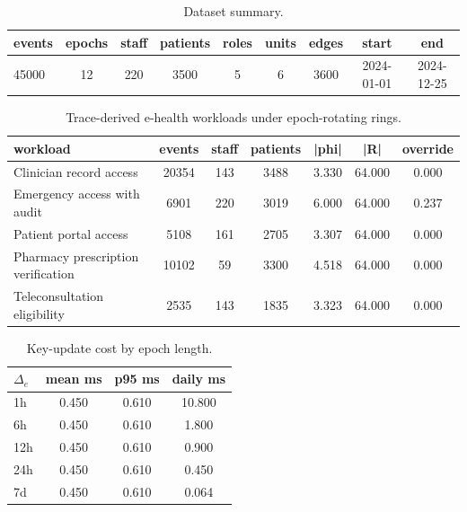 \begin{table}[t]
\centering
\caption{Dataset summary.}
\label{tab:dataset-summary}
\begin{tabular}{@{}lcccccccc@{}}
\toprule
events & epochs & staff & patients & roles & units & edges & start & end \\
\midrule
45000 & 12 & 220 & 3500 & 5 & 6 & 3600 & 2024-01-01 & 2024-12-25 \\
\bottomrule
\end{tabular}
\end{table}

\begin{table}[t]
\centering
\caption{Trace-derived e-health workloads under epoch-rotating rings.}
\label{tab:ehealth-workloads}
\begin{tabular}{@{}lcccccc@{}}
\toprule
workload & events & staff & patients & |phi| & |R| & override \\
\midrule
Clinician record access & 20354 & 143 & 3488 & 3.330 & 64.000 & 0.000 \\
Emergency access with audit & 6901 & 220 & 3019 & 6.000 & 64.000 & 0.237 \\
Patient portal access & 5108 & 161 & 2705 & 3.307 & 64.000 & 0.000 \\
Pharmacy prescription verification & 10102 & 59 & 3300 & 4.518 & 64.000 & 0.000 \\
Teleconsultation eligibility & 2535 & 143 & 1835 & 3.323 & 64.000 & 0.000 \\
\bottomrule
\end{tabular}
\end{table}

\begin{table}[t]
\centering
\caption{Key-update cost by epoch length.}
\label{tab:key-update}
\begin{tabular}{@{}lccc@{}}
\toprule
$\Delta_e$ & mean ms & p95 ms & daily ms \\
\midrule
1h & 0.450 & 0.610 & 10.800 \\
6h & 0.450 & 0.610 & 1.800 \\
12h & 0.450 & 0.610 & 0.900 \\
24h & 0.450 & 0.610 & 0.450 \\
7d & 0.450 & 0.610 & 0.064 \\
\bottomrule
\end{tabular}
\end{table}


